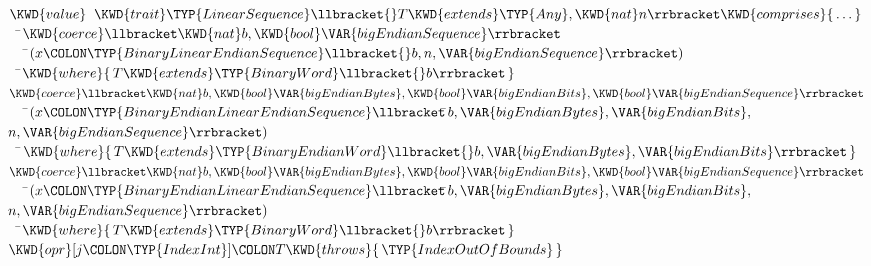 \begin{Fortress}
\(\KWD{value}\;\;\KWD{trait} \TYP{LinearSequence}\llbracket{}T \KWD{extends} \TYP{Any}, \KWD{nat} n\rrbracket \KWD{comprises} \{\,\ldots\,\}\)\\
{\tt~~}\pushtabs\=\+\(  \KWD{coerce}\llbracket\KWD{nat} b,\KWD{bool} \VAR{bigEndianSequence}\rrbracket\)\\
{\tt~~~}\pushtabs\=\+\(     (x\COLON \TYP{BinaryLinearEndianSequence}\llbracket{}b,n,\VAR{bigEndianSequence}\rrbracket)\)\-\\\poptabs
{\tt~~}\pushtabs\=\+\(    \KWD{where} \{\,T \KWD{extends} \TYP{BinaryWord}\llbracket{}b\rrbracket\,\}\)\-\\\poptabs
\(  \KWD{coerce}\llbracket\KWD{nat} b,\KWD{bool} \VAR{bigEndianBytes},\KWD{bool} \VAR{bigEndianBits},\KWD{bool} \VAR{bigEndianSequence}\rrbracket\)\\
{\tt~~~}\pushtabs\=\+\(     (x\COLON \TYP{BinaryEndianLinearEndianSequence}\llbracket\null\)\pushtabs\=\+\(b,\VAR{bigEndianBytes},\VAR{bigEndianBits},\)\\
\(                                           n,\VAR{bigEndianSequence}\rrbracket)\)\-\-\\\poptabs\poptabs
{\tt~~}\pushtabs\=\+\(    \KWD{where} \{\,T \KWD{extends} \TYP{BinaryEndianWord}\llbracket{}b,\VAR{bigEndianBytes},\VAR{bigEndianBits}\rrbracket\,\}\)\-\\\poptabs
\(  \KWD{coerce}\llbracket\KWD{nat} b,\KWD{bool} \VAR{bigEndianBytes},\KWD{bool} \VAR{bigEndianBits},\KWD{bool} \VAR{bigEndianSequence}\rrbracket\)\\
{\tt~~~}\pushtabs\=\+\(     (x\COLON \TYP{BinaryEndianLinearEndianSequence}\llbracket\null\)\pushtabs\=\+\(b,\VAR{bigEndianBytes},\VAR{bigEndianBits},\)\\
\(                                           n,\VAR{bigEndianSequence}\rrbracket)\)\-\-\\\poptabs\poptabs
{\tt~~}\pushtabs\=\+\(    \KWD{where} \{\,T \KWD{extends} \TYP{BinaryWord}\llbracket{}b\rrbracket\,\}\)\-\\\poptabs
\(  \KWD{opr} [j\COLON \TYP{IndexInt}]\COLON T \KWD{throws} \{\,\TYP{IndexOutOfBounds}\,\}\)\\

\end{Fortress}
